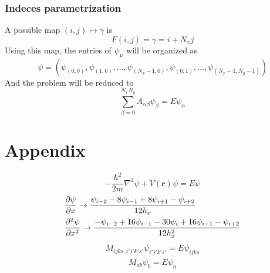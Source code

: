\documentclass{article}
\begin{document}
\subsubsection{Indeces parametrization}
A possible map $(i, j) \mapsto \gamma$ is
\begin{equation}
F(i, j) = \gamma = i + N_x j \label{eq:indeces_parametrization}
    \end{equation}
Using this map, the entries of $\psi_\mu$ will be organized as 
\begin{equation}
\psi = (\psi_{(0, 0)}, \psi_{(1, 0)}, \ldots, \psi_{(N_x-1, 0)}, \psi_{(0, 1)}, \ldots, \psi_{(N_x-1, N_y-1)})
\end{equation}
And the problem will be reduced to 
\begin{equation}
\sum_{\beta=0}^{N_x N_y}A_{\alpha\beta}\psi_{\beta} = E\psi_\alpha
\end{equation}





%
\newpage



\section{Appendix}

\begin{equation}
    -\frac{\hbar ^ 2}{2m}\nabla ^ 2 \psi + V(\mathbf r) \psi = E \psi
\end{equation}
\begin{align}
    &\pdv{\psi}{x}\rightarrow \frac{\psi_{i-2} - 8\psi_{i-1} + 8\psi_{i+1} - \psi_{i+2}}{12h_x}
    \\&\pdv[2]{\psi }{x}\rightarrow \frac{-\psi_{i-2} + 16\psi_{i-1} -30 \psi_{i} + 16\psi_{i+1} - \psi_{i+2}}{12h_x^2}
\end{align}
\begin{align}
    M_{i j k s, i' j' k' s'} \psi_{i'j'k's'} = E\psi_{ijks}
\end{align}
\begin{align}
    M_{ab}\psi_b = E\psi_a
\end{align}
\end{document}
